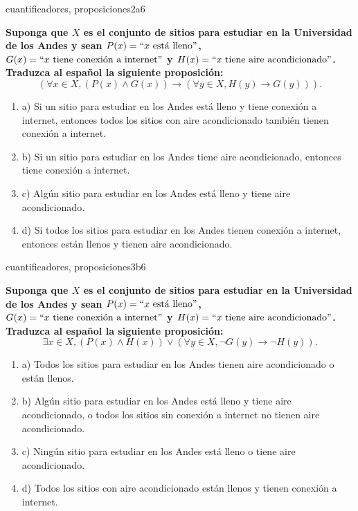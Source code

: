\documentclass{article}
\begin{document}
\begin{question}{33}{cuantificadores, proposiciones}{2}{a}{6}{
\textbf{Suponga que $X$ es el conjunto de sitios para estudiar en la Universidad de los Andes y sean $P(x)=``x\text{ está lleno}"$, $G(x)=``x\text{ tiene conexión a internet}"$ y $H(x)=``x\text{ tiene aire acondicionado}"$.}\\

\textbf{Traduzca al español la siguiente proposición:}
\[
(\forall x \in X, (P(x) \land G(x)) \rightarrow (\forall y \in X, H(y) \rightarrow G(y))).
\]

\begin{enumerate}
    \item a) Si un sitio para estudiar en los Andes está lleno y tiene conexión a internet, entonces todos los sitios con aire acondicionado también tienen conexión a internet.
    \item b) Si un sitio para estudiar en los Andes tiene aire acondicionado, entonces tiene conexión a internet.
    \item c) Algún sitio para estudiar en los Andes está lleno y tiene aire acondicionado.
    \item d) Si todos los sitios para estudiar en los Andes tienen conexión a internet, entonces están llenos y tienen aire acondicionado.
\end{enumerate}
}
\end{question}

\begin{question}{34}{cuantificadores, proposiciones}{3}{b}{6}{
\textbf{Suponga que $X$ es el conjunto de sitios para estudiar en la Universidad de los Andes y sean $P(x)=``x\text{ está lleno}"$, $G(x)=``x\text{ tiene conexión a internet}"$ y $H(x)=``x\text{ tiene aire acondicionado}"$.}\\

\textbf{Traduzca al español la siguiente proposición:}
\[
\exists x \in X, (P(x) \land H(x)) \lor (\forall y \in X, \neg G(y) \rightarrow \neg H(y)).
\]

\begin{enumerate}
    \item a) Todos los sitios para estudiar en los Andes tienen aire acondicionado o están llenos.
    \item b) Algún sitio para estudiar en los Andes está lleno y tiene aire acondicionado, o todos los sitios sin conexión a internet no tienen aire acondicionado.
    \item c) Ningún sitio para estudiar en los Andes está lleno o tiene aire acondicionado.
    \item d) Todos los sitios con aire acondicionado están llenos y tienen conexión a internet.
\end{enumerate}
}
\end{question}
\end{document}
